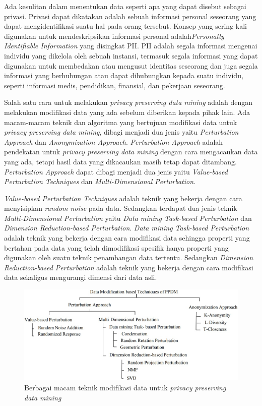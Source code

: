 \documentclass[a4paper,twoside]{article}
\begin{document}
Ada kesulitan dalam menentukan data seperti apa yang dapat disebut sebagai privasi. Privasi dapat dikatakan adalah sebuah informasi personal seseorang yang dapat mengidentifikasi suatu hal pada orang tersebut. Konsep yang sering kali digunakan untuk mendeskripsikan informasi personal adalah\textit{Personally Identifiable Information} yang disingkat PII. PII adalah segala informasi mengenai individu yang dikelola oleh sebuah instansi, termasuk segala informasi yang dapat digunakan untuk membedakan atau mengusut identitas seseorang dan juga segala informasi yang berhubungan atau dapat dihubungkan kepada suatu individu, seperti informasi medis, pendidikan, finansial, dan pekerjaan seseorang. 

Salah satu cara untuk melakukan \textit{privacy preserving data mining} adalah dengan melakukan modifikasi data yang ada sebelum diberikan kepada pihak lain. Ada macam-macam teknik dan algoritma yang bertujuan modifikasi data untuk \textit{privacy preserving data mining}, dibagi menjadi dua jenis yaitu \textit{Perturbation Approach} dan \textit{Anonymization Approach}. \textit{Perturbation Approach} adalah pendekatan untuk \textit{privacy preserving data mining} dengan cara mengacaukan data yang ada, tetapi hasil data yang dikacaukan masih tetap dapat ditambang. \textit{Perturbation Approach} dapat dibagi menjadi dua jenis yaitu \textit{Value-based Perturbation Techniques} dan \textit{Multi-Dimensional Perturbation}.

\textit{Value-based Perturbation Techniques} adalah teknik yang bekerja dengan cara menyisipkan \textit{random noise} pada data. Sedangkan terdapat dua jenis teknik \textit{Multi-Dimensional Perturbation} yaitu \textit{Data mining Task-based Perturbation} dan \textit{Dimension Reduction-based Perturbation}. \textit{Data mining Task-based Perturbation} adalah teknik yang bekerja dengan cara modifikasi data sehingga properti yang bertahan pada data yang telah dimodifikasi spesifik hanya properti yang digunakan oleh suatu teknik penambangan data tertentu. Sedangkan \textit{Dimension Reduction-based Perturbation} adalah teknik yang bekerja dengan cara modifikasi data sekaligus mengurangi dimensi dari data asli.

\begin{figure}
	\centering
	\includegraphics[scale=0.56]{ppdm}
	\caption{Berbagai macam teknik modifikasi data untuk \textit{privacy preserving data mining}}
	\label{fig:ppdm}
\end{figure}
\end{document}
